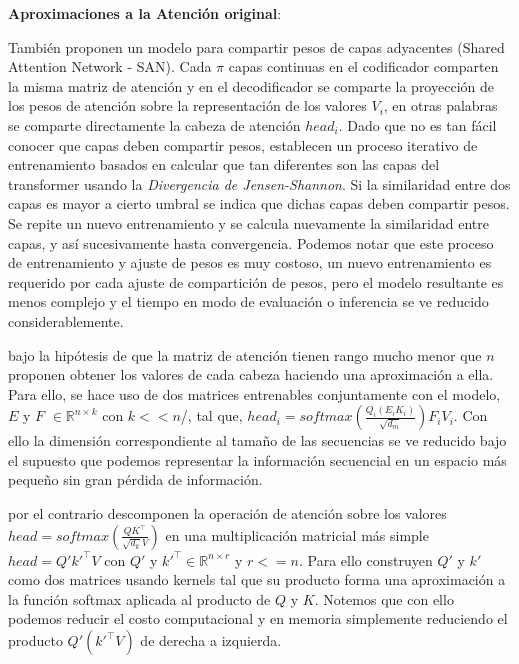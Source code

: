 \textbf{Aproximaciones a la Atención original}:

También \citeauthor*{DBLP:journals/corr/abs-1906-11024} proponen un modelo para compartir pesos de capas
adyacentes (Shared Attention Network - SAN).
Cada $\pi$ capas continuas en el codificador comparten la misma matriz de atención y en el
decodificador se comparte la proyección de los pesos de atención sobre la representación de los
valores $V_i$, en otras palabras se comparte directamente la cabeza de atención $head_i$. Dado que no
es tan fácil conocer que capas deben compartir pesos, establecen un proceso iterativo
de entrenamiento basados en calcular que tan diferentes son las capas del transformer usando
la \textit{Divergencia de Jensen-Shannon}. Si la similaridad entre dos capas es mayor a cierto umbral
se indica que dichas capas deben compartir pesos. Se repite un nuevo entrenamiento y se calcula
nuevamente la similaridad entre capas, y así sucesivamente hasta convergencia. Podemos notar que este
proceso de entrenamiento y ajuste de pesos es muy costoso, un nuevo entrenamiento es requerido por
cada ajuste de compartición de pesos, pero el modelo resultante
es menos complejo y el tiempo en modo de evaluación o inferencia se ve reducido considerablemente.

\citeauthor*{DBLP:journals/corr/abs-2006-04768} bajo la hipótesis de que la matriz de atención tienen
rango mucho menor que $n$ proponen obtener los valores de cada cabeza haciendo una aproximación a ella.
Para ello, se hace uso de dos matrices entrenables conjuntamente con el modelo, $E$ y $F$
$\in \mathbb{R}^{n \times k}$ con $k<<n$/, tal que,
$head_i = softmax(\frac{Q_i (E_i K_i)}{\sqrt{d_m}}) F_iV_i$. Con ello la dimensión correspondiente al
tamaño de las secuencias se ve reducido bajo el supuesto que podemos representar la información
secuencial en un espacio más pequeño sin gran pérdida de información.

\citeauthor*{DBLP:journals/corr/abs-2009-14794} por el contrario descomponen la operación de atención
sobre los valores $head = softmax(\frac{QK^\top}{\sqrt{d_k} V})$ en una multiplicación matricial más simple
$head = Q'k'^\top V$ con $Q'$ y $k'^\top \in \mathbb{R}^{n \times r}$ y $r<=n$.
Para ello construyen $Q'$ y $k'$ como dos matrices usando kernels tal que su producto forma una
aproximación a la función softmax aplicada al producto de $Q$ y $K$. Notemos que con ello podemos
reducir el costo computacional y en
memoria simplemente reduciendo el producto $Q'(k'^\top V)$ de derecha a izquierda.

